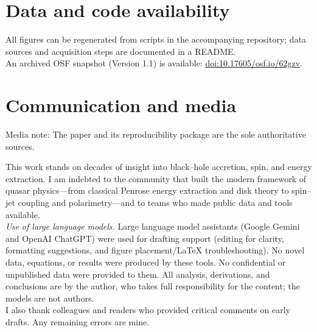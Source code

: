 \documentclass[twocolumn]{aastex701}
\begin{document}
\section*{Data and code availability}
All figures can be regenerated from scripts in the accompanying repository; data sources and acquisition steps are documented in a README.\\
An archived OSF snapshot (Version 1.1) is available: \href{https://doi.org/10.17605/osf.io/62gzv}{doi:10.17605/osf.io/62gzv}.
\section*{Communication and media}
Media note: The paper and its reproducibility package are the sole authoritative sources.

\begin{acknowledgments}
This work stands on decades of insight into black–hole accretion, spin, and energy extraction. I am indebted to the community that built the modern framework of quasar physics—from classical Penrose energy extraction and disk theory to spin–jet coupling and polarimetry—and to teams who made public data and tools available.
\\[2pt]
\textit{Use of large language models.} Large language model assistants (Google Gemini and OpenAI ChatGPT) were used for drafting support (editing for clarity, formatting suggestions, and figure placement/LaTeX troubleshooting). No novel data, equations, or results were produced by these tools. No confidential or unpublished data were provided to them. All analysis, derivations, and conclusions are by the author, who takes full responsibility for the content; the models are not authors.
\\[2pt]
I also thank colleagues and readers who provided critical comments on early drafts. Any remaining errors are mine.
\end{acknowledgments}


\nocite{*}


\end{document}
